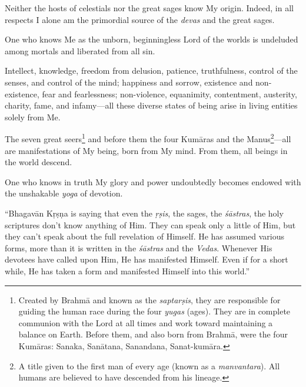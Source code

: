 {Neither the hosts of celestials nor the great sages know My origin. Indeed, in all respects I alone am the primordial source of the \textit{devas} and the great sages.}

{One who knows Me as the unborn, beginningless Lord of the worlds is undeluded among mortals and liberated from all sin.}

{Intellect, knowledge, freedom from delusion, patience, truthfulness, control of the senses, and control of the mind; happiness and sorrow, existence and non-existence, fear and fearlessness; non-violence, equanimity, contentment, austerity, charity, fame, and infamy---all these diverse states of being arise in living entities solely from Me.}

{The seven great seers\footnote{Created by Brahmā and known as the \textit{saptarṣis}, they are responsible for guiding the human race during the four \textit{yugas} (ages). They are in complete communion with the Lord at all times and work toward maintaining a balance on Earth. Before them, and also born from Brahmā, were the four Kumāras: Sanaka, Sanātana, Sanandana, Sanat-kumāra.} and before them the four Kumāras and the Manus\footnote{A title given to the first man of every age (known as a \textit{manvantara}). All humans are believed to have descended from his lineage.
}---all are manifestations of My being, born from My mind. From them, all beings in the world descend.}

{One who knows in truth My glory and power undoubtedly becomes endowed with the unshakable \textit{yoga} of devotion.}

\enquote{Bhagavān Kṛṣṇa is saying that even the \textit{ṛṣis}, the sages, the \textit{śāstras}, the holy scriptures don’t know anything of Him. They can speak only a little of Him, but they can’t speak about the full revelation of Himself. He has assumed various forms, more than it is written in the \textit{śāstras} and the \textit{Vedas}. Whenever His devotees have called upon Him, He has manifested Himself. Even if for a short while, He has taken a form and manifested Himself into this world.}

